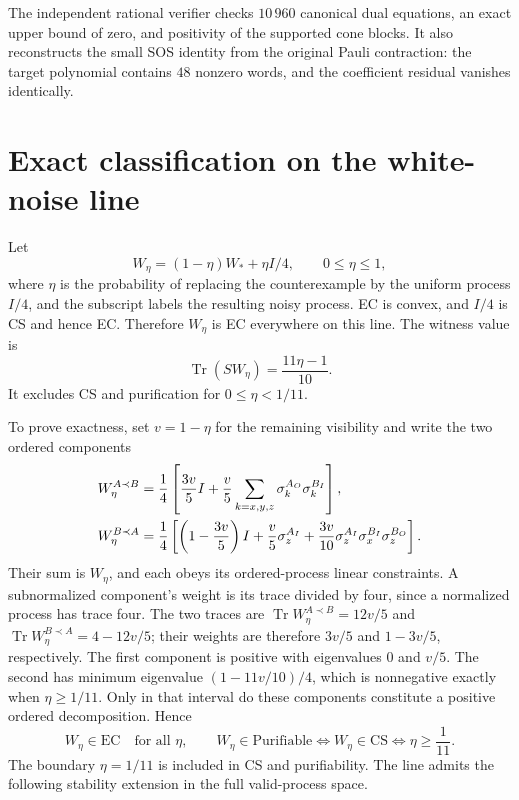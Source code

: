 \documentclass[11pt]{article}
\newcommand{\Tr}{\operatorname{Tr}}
\newcommand{\CS}{\mathrm{CS}}
\newcommand{\EC}{\mathrm{EC}}
\begin{document}
The independent rational verifier checks $10\,960$ canonical dual equations, an exact upper bound of zero, and positivity of the supported cone blocks. It also reconstructs the small SOS identity from the original Pauli contraction: the target polynomial contains $48$ nonzero words, and the coefficient residual vanishes identically.

\section{Exact classification on the white-noise line}
Let
\begin{equation}
 W_\eta=(1-\eta)W_*+\eta I/4,\qquad 0\le\eta\le1,
 \label{eq:noise}
\end{equation}
where $\eta$ is the probability of replacing the counterexample by the uniform process $I/4$, and the subscript labels the resulting noisy process. EC is convex, and $I/4$ is CS and hence EC. Therefore $W_\eta$ is EC everywhere on this line. The witness value is
\begin{equation}
 \Tr(SW_\eta)=\frac{11\eta-1}{10}.
 \label{eq:noise-witness}
\end{equation}
It excludes CS and purification for $0\le\eta<1/11$.

To prove exactness, set $v=1-\eta$ for the remaining visibility and write the two ordered components
\begin{align}
 W_\eta^{A\prec B}&=\frac14\left[\frac{3v}{5}I
          +\frac v5\sum_{k=x,y,z}\sigma_k^{A_O}\sigma_k^{B_I}\right],\notag\\
 W_\eta^{B\prec A}&=\frac14\left[\left(1-\frac{3v}{5}\right)I
          +\frac v5\sigma_z^{A_I}
          +\frac{3v}{10}\sigma_z^{A_I}\sigma_x^{B_I}\sigma_z^{B_O}\right].
 \label{eq:noise-ordered-decomposition}
\end{align}
Their sum is $W_\eta$, and each obeys its ordered-process linear constraints. A subnormalized component's weight is its trace divided by four, since a normalized process has trace four. The two traces are $\Tr W_\eta^{A\prec B}=12v/5$ and $\Tr W_\eta^{B\prec A}=4-12v/5$; their weights are therefore $3v/5$ and $1-3v/5$, respectively. The first component is positive with eigenvalues $0$ and $v/5$. The second has minimum eigenvalue $(1-11v/10)/4$, which is nonnegative exactly when $\eta\ge1/11$. Only in that interval do these components constitute a positive ordered decomposition. Hence
\begin{equation}
 W_\eta\in\EC\quad\text{for all }\eta,\qquad
 W_\eta\in\mathrm{Purifiable}\Longleftrightarrow
 W_\eta\in\CS\Longleftrightarrow\eta\ge\frac1{11}.
 \label{eq:noise-classification}
\end{equation}
The boundary $\eta=1/11$ is included in CS and purifiability. The line admits the following stability extension in the full valid-process space.
\end{document}
